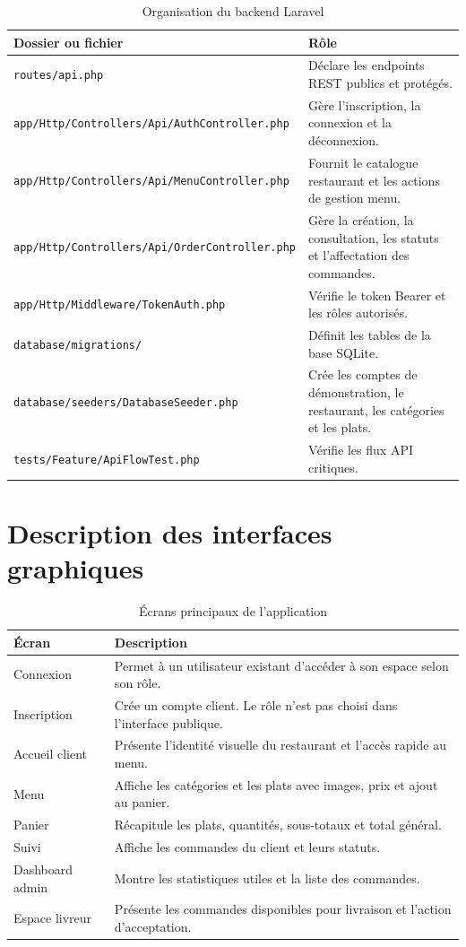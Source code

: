 \documentclass[12pt,a4paper]{report}
\begin{document}
\begin{longtable}{p{5cm}p{9cm}}
\caption{Organisation du backend Laravel}\\
\toprule
\textbf{Dossier ou fichier} & \textbf{Rôle}\\
\midrule
\nolinkurl{routes/api.php} & Déclare les endpoints REST publics et protégés.\\
\nolinkurl{app/Http/Controllers/Api/AuthController.php} & Gère l'inscription, la connexion et la déconnexion.\\
\nolinkurl{app/Http/Controllers/Api/MenuController.php} & Fournit le catalogue restaurant et les actions de gestion menu.\\
\nolinkurl{app/Http/Controllers/Api/OrderController.php} & Gère la création, la consultation, les statuts et l'affectation des commandes.\\
\nolinkurl{app/Http/Middleware/TokenAuth.php} & Vérifie le token Bearer et les rôles autorisés.\\
\nolinkurl{database/migrations/} & Définit les tables de la base SQLite.\\
\nolinkurl{database/seeders/DatabaseSeeder.php} & Crée les comptes de démonstration, le restaurant, les catégories et les plats.\\
\nolinkurl{tests/Feature/ApiFlowTest.php} & Vérifie les flux API critiques.\\
\bottomrule
\end{longtable}

\section{Description des interfaces graphiques}
\begin{longtable}{p{4cm}p{10cm}}
\caption{Écrans principaux de l'application}\\
\toprule
\textbf{Écran} & \textbf{Description}\\
\midrule
Connexion & Permet à un utilisateur existant d'accéder à son espace selon son rôle.\\
Inscription & Crée un compte client. Le rôle n'est pas choisi dans l'interface publique.\\
Accueil client & Présente l'identité visuelle du restaurant et l'accès rapide au menu.\\
Menu & Affiche les catégories et les plats avec images, prix et ajout au panier.\\
Panier & Récapitule les plats, quantités, sous-totaux et total général.\\
Suivi & Affiche les commandes du client et leurs statuts.\\
Dashboard admin & Montre les statistiques utiles et la liste des commandes.\\
Espace livreur & Présente les commandes disponibles pour livraison et l'action d'acceptation.\\
\bottomrule
\end{longtable}
\end{document}
